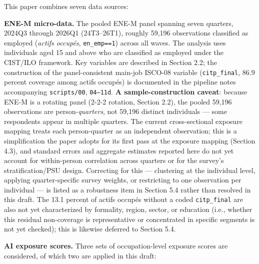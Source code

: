 \documentclass[
  11pt,
]{article}
\begin{document}
This paper combines seven data sources:

\textbf{ENE-M micro-data.} The pooled ENE-M panel spanning seven
quarters, 2024Q3 through 2026Q1 (24T3--26T1), roughly 59,196
observations classified as employed (\emph{actifs occupés},
\texttt{en\_emp==1}) across all waves. The analysis uses individuals
aged 15 and above who are classified as employed under the CIST/ILO
framework. Key variables are described in Section 2.2; the construction
of the panel-consistent main-job ISCO-08 variable (\texttt{citp\_final},
86.9 percent coverage among actifs occupés) is documented in the
pipeline notes accompanying \texttt{scripts/00}, \texttt{04–11d}.
\textbf{A sample-construction caveat}: because ENE-M is a rotating panel
(2-2-2 rotation, Section 2.2), the pooled 59,196 observations are
person-\emph{quarters}, not 59,196 distinct individuals --- some
respondents appear in multiple quarters. The current cross-sectional
exposure mapping treats each person-quarter as an independent
observation; this is a simplification the paper adopts for its first
pass at the exposure mapping (Section 4.3), and standard errors and
aggregate estimates reported here do not yet account for within-person
correlation across quarters or for the survey's stratification/PSU
design. Correcting for this --- clustering at the individual level,
applying quarter-specific survey weights, or restricting to one
observation per individual --- is listed as a robustness item in Section
5.4 rather than resolved in this draft. The 13.1 percent of actifs
occupés without a coded \texttt{citp\_final} are also not yet
characterized by formality, region, sector, or education (i.e., whether
this residual non-coverage is representative or concentrated in specific
segments is not yet checked); this is likewise deferred to Section 5.4.

\textbf{AI exposure scores.} Three sets of occupation-level exposure
scores are considered, of which two are applied in this draft:
\end{document}
